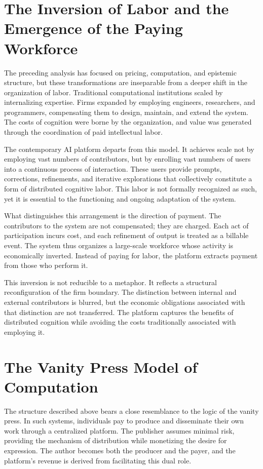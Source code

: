 \documentclass[12pt, oneside]{article}
\begin{document}
\section{The Inversion of Labor and the Emergence of the Paying Workforce}

The preceding analysis has focused on pricing, computation, and epistemic structure, but these transformations are inseparable from a deeper shift in the organization of labor. Traditional computational institutions scaled by internalizing expertise. Firms expanded by employing engineers, researchers, and programmers, compensating them to design, maintain, and extend the system. The costs of cognition were borne by the organization, and value was generated through the coordination of paid intellectual labor.

The contemporary AI platform departs from this model. It achieves scale not by employing vast numbers of contributors, but by enrolling vast numbers of users into a continuous process of interaction. These users provide prompts, corrections, refinements, and iterative explorations that collectively constitute a form of distributed cognitive labor. This labor is not formally recognized as such, yet it is essential to the functioning and ongoing adaptation of the system.

What distinguishes this arrangement is the direction of payment. The contributors to the system are not compensated; they are charged. Each act of participation incurs cost, and each refinement of output is treated as a billable event. The system thus organizes a large-scale workforce whose activity is economically inverted. Instead of paying for labor, the platform extracts payment from those who perform it.

This inversion is not reducible to a metaphor. It reflects a structural reconfiguration of the firm boundary. The distinction between internal and external contributors is blurred, but the economic obligations associated with that distinction are not transferred. The platform captures the benefits of distributed cognition while avoiding the costs traditionally associated with employing it.

\section{The Vanity Press Model of Computation}

The structure described above bears a close resemblance to the logic of the vanity press. In such systems, individuals pay to produce and disseminate their own work through a centralized platform. The publisher assumes minimal risk, providing the mechanism of distribution while monetizing the desire for expression. The author becomes both the producer and the payer, and the platform's revenue is derived from facilitating this dual role.
\end{document}
